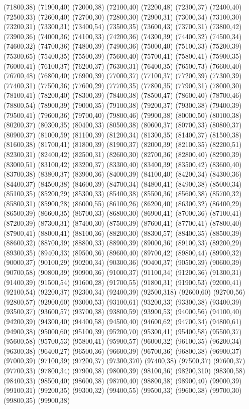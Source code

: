 (71800,38)
(71900,40)
(72000,38)
(72100,40)
(72200,48)
(72300,37)
(72400,40)
(72500,33)
(72600,40)
(72700,30)
(72800,30)
(72900,31)
(73000,34)
(73100,30)
(73200,31)
(73300,31)
(73400,54)
(73500,35)
(73600,43)
(73700,31)
(73800,42)
(73900,36)
(74000,36)
(74100,33)
(74200,36)
(74300,39)
(74400,32)
(74500,34)
(74600,32)
(74700,36)
(74800,39)
(74900,36)
(75000,40)
(75100,33)
(75200,39)
(75300,65)
(75400,35)
(75500,39)
(75600,40)
(75700,41)
(75800,41)
(75900,35)
(76000,41)
(76100,37)
(76200,37)
(76300,31)
(76400,35)
(76500,73)
(76600,40)
(76700,48)
(76800,40)
(76900,39)
(77000,37)
(77100,37)
(77200,39)
(77300,39)
(77400,31)
(77500,36)
(77600,29)
(77700,35)
(77800,35)
(77900,31)
(78000,30)
(78100,41)
(78200,40)
(78300,39)
(78400,38)
(78500,47)
(78600,40)
(78700,46)
(78800,54)
(78900,39)
(79000,35)
(79100,38)
(79200,37)
(79300,38)
(79400,39)
(79500,41)
(79600,36)
(79700,40)
(79800,46)
(79900,38)
(80000,50)
(80100,38)
(80200,37)
(80300,35)
(80400,33)
(80500,38)
(80600,37)
(80700,33)
(80800,37)
(80900,37)
(81000,59)
(81100,39)
(81200,34)
(81300,35)
(81400,37)
(81500,38)
(81600,38)
(81700,41)
(81800,39)
(81900,37)
(82000,39)
(82100,35)
(82200,51)
(82300,31)
(82400,42)
(82500,31)
(82600,30)
(82700,36)
(82800,40)
(82900,39)
(83000,51)
(83100,42)
(83200,37)
(83300,40)
(83400,39)
(83500,42)
(83600,40)
(83700,38)
(83800,37)
(83900,36)
(84000,39)
(84100,40)
(84200,34)
(84300,36)
(84400,37)
(84500,38)
(84600,39)
(84700,34)
(84800,41)
(84900,38)
(85000,34)
(85100,35)
(85200,29)
(85300,33)
(85400,38)
(85500,36)
(85600,38)
(85700,32)
(85800,31)
(85900,28)
(86000,55)
(86100,26)
(86200,40)
(86300,32)
(86400,29)
(86500,39)
(86600,35)
(86700,33)
(86800,30)
(86900,41)
(87000,36)
(87100,41)
(87200,39)
(87300,31)
(87400,30)
(87500,39)
(87600,41)
(87700,41)
(87800,40)
(87900,41)
(88000,41)
(88100,36)
(88200,30)
(88300,57)
(88400,35)
(88500,39)
(88600,32)
(88700,39)
(88800,33)
(88900,39)
(89000,36)
(89100,33)
(89200,29)
(89300,35)
(89400,33)
(89500,36)
(89600,40)
(89700,42)
(89800,44)
(89900,32)
(90000,37)
(90100,29)
(90200,34)
(90300,36)
(90400,37)
(90500,39)
(90600,39)
(90700,58)
(90800,39)
(90900,36)
(91000,37)
(91100,34)
(91200,36)
(91300,31)
(91400,39)
(91500,54)
(91600,28)
(91700,55)
(91800,31)
(91900,53)
(92000,41)
(92100,54)
(92200,37)
(92300,34)
(92400,39)
(92500,318)
(92600,60)
(92700,56)
(92800,57)
(92900,60)
(93000,53)
(93100,61)
(93200,33)
(93300,38)
(93400,39)
(93500,37)
(93600,57)
(93700,38)
(93800,59)
(93900,53)
(94000,56)
(94100,40)
(94200,39)
(94300,40)
(94400,58)
(94500,40)
(94600,62)
(94700,34)
(94800,61)
(94900,38)
(95000,60)
(95100,39)
(95200,70)
(95300,41)
(95400,58)
(95500,37)
(95600,58)
(95700,53)
(95800,41)
(95900,57)
(96000,32)
(96100,35)
(96200,34)
(96300,38)
(96400,27)
(96500,36)
(96600,39)
(96700,36)
(96800,38)
(96900,37)
(97000,39)
(97100,39)
(97200,37)
(97300,370)
(97400,38)
(97500,37)
(97600,37)
(97700,33)
(97800,34)
(97900,38)
(98000,39)
(98100,36)
(98200,310)
(98300,58)
(98400,33)
(98500,40)
(98600,38)
(98700,40)
(98800,38)
(98900,40)
(99000,39)
(99100,31)
(99200,35)
(99300,32)
(99400,55)
(99500,33)
(99600,38)
(99700,30)
(99800,35)
(99900,38)
